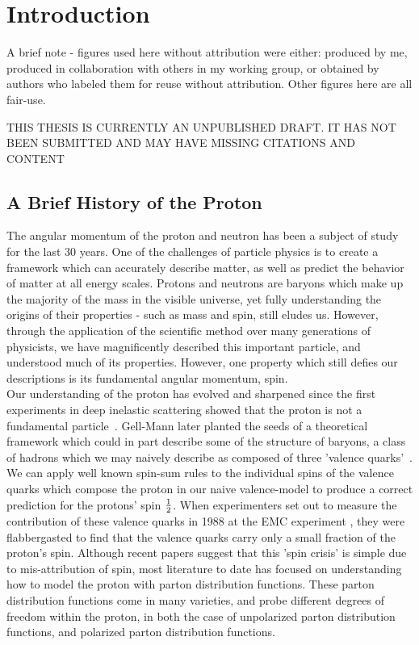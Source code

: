 \chapter{Introduction}

A brief note - figures used here without attribution were either: produced by
me, produced in collaboration with others in my working group, or obtained by
authors who labeled them for reuse without attribution. Other figures here are
all fair-use.

THIS THESIS IS CURRENTLY AN UNPUBLISHED DRAFT. IT HAS NOT BEEN SUBMITTED AND MAY
HAVE MISSING CITATIONS AND CONTENT

\section{A Brief History of the Proton}
The angular momentum of the proton and neutron has been a subject of study for
the last 30 years. One of the challenges of particle physics is to
create a framework which can accurately describe matter, as well as predict the
behavior of matter at all energy scales. Protons and neutrons are baryons which
make up the majority of the mass in the visible universe, yet fully
understanding the origins of their properties - such as  mass and spin, still
eludes us. However, through the application of the scientific method over many
generations of physicists, we have magnificently described this important
particle, and understood much of its properties. However, one property which
still defies our descriptions is its fundamental angular momentum, spin. \\
	
Our understanding of the proton has evolved and sharpened since the first
experiments in deep inelastic scattering showed that the proton is not a
fundamental particle~\cite{Breidenbach1969}. Gell-Mann later planted the seeds
of a theoretical framework which could in part describe some of the structure of
baryons, a class of hadrons which we may naively describe as composed of three
'valence quarks'~\cite{Bjorken1969}. We can apply well known spin-sum rules to the
individual spins of the valence quarks which compose the proton in our naive
valence-model to produce a correct prediction for the protons' spin
${1}\over{2}$. When experimenters set out to measure the contribution of these
valence quarks in 1988 at the EMC experiment \cite{Ashman1988}, they were
flabbergasted to find that the valence quarks carry only a small fraction of the
proton's spin. Although recent papers \cite{Povh2016} suggest that this 'spin
crisis' is simple due to mis-attribution of spin, most literature to date has
focused on understanding how to model the proton with parton distribution
functions. These parton distribution functions come in many varieties, and probe
different degrees of freedom within the proton, in both the case of unpolarized
parton distribution functions, and polarized parton distribution functions. \\
 
